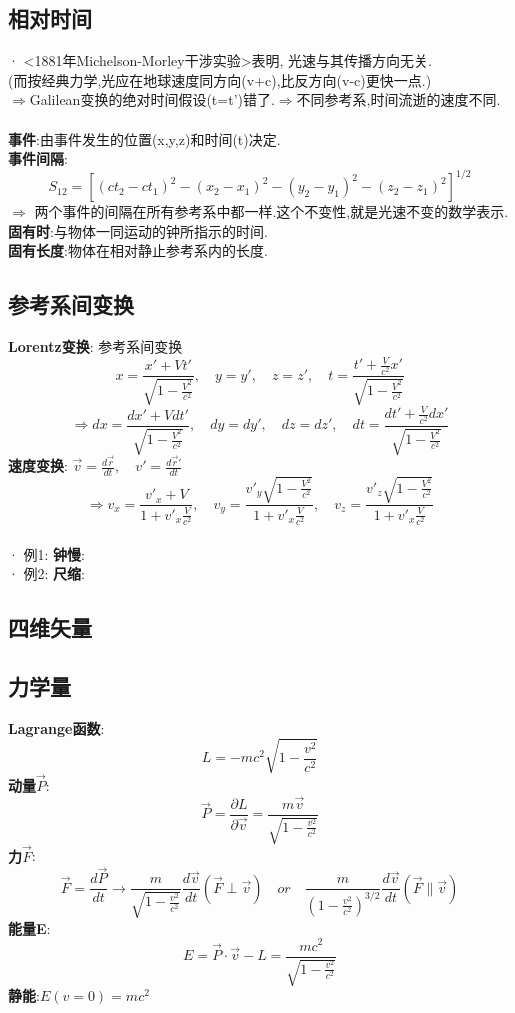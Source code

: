 \documentclass{article}
\begin{document}
\subsection{相对时间}
· <1881年Michelson-Morley干涉实验>表明, 光速与其传播方向无关.\\
(而按经典力学,光应在地球速度同方向(v+c),比反方向(v-c)更快一点.)\\
$\Rightarrow$Galilean变换的绝对时间假设(t=t')错了.\quad  $\Rightarrow$不同参考系,时间流逝的速度不同.\\
\\
\textbf{事件}:由事件发生的位置(x,y,z)和时间(t)决定.\\
\textbf{事件间隔}:
\[S_{12} = [(ct_2-ct_1)^2 - (x_2-x_1)^2 - (y_2-y_1)^2 - (z_2-z_1)^2]^{1/2}\]
$\Rightarrow$ 两个事件的间隔在所有参考系中都一样.\quad 这个不变性,就是光速不变的数学表示.\\
\textbf{固有时}:与物体一同运动的钟所指示的时间.\\
\textbf{固有长度}:物体在相对静止参考系内的长度.


\subsection{参考系间变换}
\textbf{Lorentz变换}: 参考系间变换
\[ x = \frac{x' + V t'}{\sqrt{1 - \frac{V^2}{c^2}}},\quad y=y',\quad z=z'
, \quad t = \frac{t'+ \frac{V}{c^2}x'}{\sqrt{1 - \frac{V^2}{c^2}}}\]
\[ \Rightarrow dx = \frac{dx' + V dt'}{\sqrt{1 - \frac{V^2}{c^2}}},\quad dy=dy',\quad dz=dz'
, \quad dt = \frac{dt'+ \frac{V}{c^2}dx'}{\sqrt{1 - \frac{V^2}{c^2}}}\]
\textbf{速度变换}: $\vec v = \frac{d\vec r}{dt},\quad v' = \frac{d\vec r'}{dt}$
\[\Rightarrow v_x = \frac{v'_x + V}{1 + v'_x \frac{V}{c^2}}, \quad v_y = \frac{v'_y \sqrt{1 - \frac{V^2}{c^2}}}{1 + v'_x \frac{V}{c^2}},\quad v_z = \frac{v'_z \sqrt{1 - \frac{V^2}{c^2}}}{1 + v'_x \frac{V}{c^2}}\]\\
· 例1: \textbf{钟慢}:\\
· 例2: \textbf{尺缩}:\\


\subsection{四维矢量}


\subsection{力学量}
\textbf{Lagrange函数}:
\[L = -m c^2 \sqrt{1 - \frac{v^2}{c^2}}\]
\textbf{动量$\vec P$}:
\[\vec P = \frac{\partial L}{\partial \vec v} = \frac{m \vec v}{\sqrt{1 - \frac{v^2}{c^2}}}\]
\textbf{力$\vec F$}:
\[\vec F = \frac{d\vec P}{dt} \to \frac{m}{\sqrt{1 - \frac{v^2}{c^2}}} \frac{d\vec v}{dt}(\vec F \perp \vec v) 
\quad or\quad  \frac{m}{(1 - \frac{v^2}{c^2})^{3/2}} \frac{d\vec v}{dt} (\vec F \parallel \vec v)\]
\textbf{能量E}:
\[E = \vec P \cdot \vec v - L = \frac{mc^2}{\sqrt{1 - \frac{v^2}{c^2}}}\]
\textbf{静能}:\quad $E(v=0) = mc^2$\\
\end{document}

